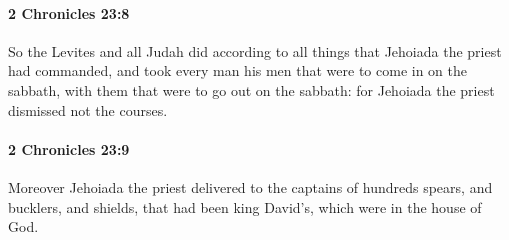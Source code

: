 		\paragraph{2 Chronicles 23:8} %
			\label{2CHRONICLES-23-8}

			So the Levites and all Judah did according to all things that Jehoiada the priest had commanded, and took every man his men that were to come in on the sabbath, with them that were to go out on the sabbath: for Jehoiada the priest dismissed not the courses.


		\paragraph{2 Chronicles 23:9} %
			\label{2CHRONICLES-23-9}

			Moreover Jehoiada the priest delivered to the captains of hundreds spears, and bucklers, and shields, that had been king David's, which were in the house of God.

